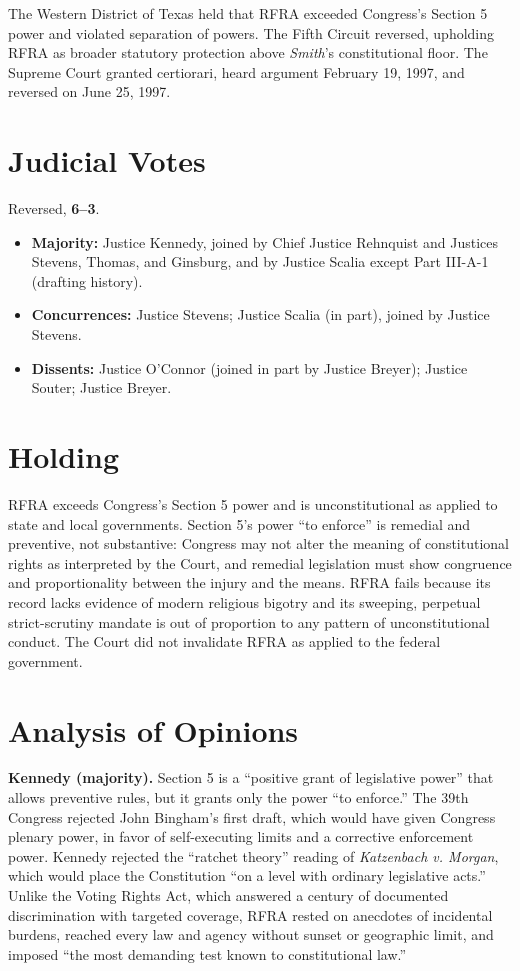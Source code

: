 \documentclass[12pt]{article}
\begin{document}
The Western District of Texas held that RFRA exceeded Congress's Section 5 power and violated separation of powers. The Fifth Circuit reversed, upholding RFRA as broader statutory protection above \textit{Smith}'s constitutional floor. The Supreme Court granted certiorari, heard argument February 19, 1997, and reversed on June 25, 1997.

\section{Judicial Votes}

Reversed, \textbf{6--3}.
\begin{itemize}
\item \textbf{Majority:} Justice Kennedy, joined by Chief Justice Rehnquist and Justices Stevens, Thomas, and Ginsburg, and by Justice Scalia except Part III-A-1 (drafting history).
\item \textbf{Concurrences:} Justice Stevens; Justice Scalia (in part), joined by Justice Stevens.
\item \textbf{Dissents:} Justice O'Connor (joined in part by Justice Breyer); Justice Souter; Justice Breyer.
\end{itemize}

\section{Holding}

RFRA exceeds Congress's Section 5 power and is unconstitutional as applied to state and local governments. Section 5's power ``to enforce'' is remedial and preventive, not substantive: Congress may not alter the meaning of constitutional rights as interpreted by the Court, and remedial legislation must show congruence and proportionality between the injury and the means. RFRA fails because its record lacks evidence of modern religious bigotry and its sweeping, perpetual strict-scrutiny mandate is out of proportion to any pattern of unconstitutional conduct. The Court did not invalidate RFRA as applied to the federal government.

\section{Analysis of Opinions}

\textbf{Kennedy (majority).} Section 5 is a ``positive grant of legislative power'' that allows preventive rules, but it grants only the power ``to enforce.'' The 39th Congress rejected John Bingham's first draft, which would have given Congress plenary power, in favor of self-executing limits and a corrective enforcement power. Kennedy rejected the ``ratchet theory'' reading of \textit{Katzenbach v. Morgan}, which would place the Constitution ``on a level with ordinary legislative acts.'' Unlike the Voting Rights Act, which answered a century of documented discrimination with targeted coverage, RFRA rested on anecdotes of incidental burdens, reached every law and agency without sunset or geographic limit, and imposed ``the most demanding test known to constitutional law.''
\end{document}
